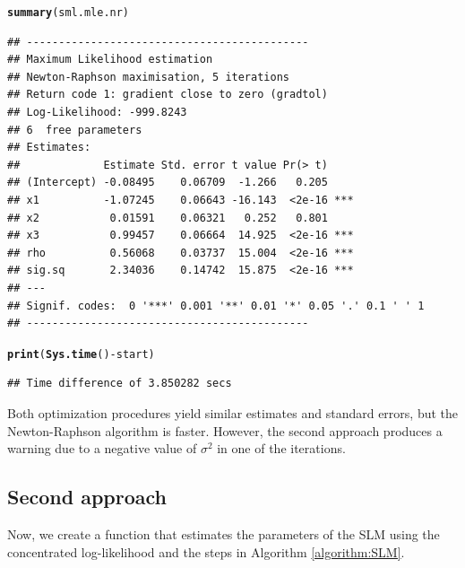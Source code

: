 \documentclass[english,12pt]{book}\usepackage[]{graphicx}\usepackage[]{xcolor}
\makeatletter
\newcommand{\hlopt}[1]{\textcolor[rgb]{0,0,0}{#1}}%
\newcommand{\hlstd}[1]{\textcolor[rgb]{0.345,0.345,0.345}{#1}}%
\newcommand{\hlkwd}[1]{\textcolor[rgb]{0.737,0.353,0.396}{\textbf{#1}}}%
\newenvironment{kframe}{%
 \def\at@end@of@kframe{}%
 \ifinner\ifhmode%
  \def\at@end@of@kframe{\end{minipage}}%
  \begin{minipage}{\columnwidth}%
 \fi\fi%
 \def\FrameCommand##1{\hskip\@totalleftmargin \hskip-\fboxsep
 \colorbox{shadecolor}{##1}\hskip-\fboxsep
     \hskip-\linewidth \hskip-\@totalleftmargin \hskip\columnwidth}%
 \MakeFramed {\advance\hsize-\width
   \@totalleftmargin\z@ \linewidth\hsize
   \@setminipage}}%
 {\par\unskip\endMakeFramed%
 \at@end@of@kframe}
\newenvironment{knitrout}{}{} %
\makeatother
\begin{document}
\begin{knitrout}
\begin{kframe}
{\ttfamily\noindent\color{warningcolor}{\#\# Warning in log(2 * pi * sig.sq): NaNs produced}}\begin{alltt}
\hlkwd{summary}\hlstd{(sml.mle.nr)}
\end{alltt}
\begin{verbatim}
## --------------------------------------------
## Maximum Likelihood estimation
## Newton-Raphson maximisation, 5 iterations
## Return code 1: gradient close to zero (gradtol)
## Log-Likelihood: -999.8243 
## 6  free parameters
## Estimates:
##             Estimate Std. error t value Pr(> t)    
## (Intercept) -0.08495    0.06709  -1.266   0.205    
## x1          -1.07245    0.06643 -16.143  <2e-16 ***
## x2           0.01591    0.06321   0.252   0.801    
## x3           0.99457    0.06664  14.925  <2e-16 ***
## rho          0.56068    0.03737  15.004  <2e-16 ***
## sig.sq       2.34036    0.14742  15.875  <2e-16 ***
## ---
## Signif. codes:  0 '***' 0.001 '**' 0.01 '*' 0.05 '.' 0.1 ' ' 1
## --------------------------------------------
\end{verbatim}
\begin{alltt}
\hlkwd{print}\hlstd{(}\hlkwd{Sys.time}\hlstd{()}\hlopt{-} \hlstd{start)}
\end{alltt}
\begin{verbatim}
## Time difference of 3.850282 secs
\end{verbatim}
\end{kframe}
\end{knitrout}

Both optimization procedures yield similar estimates and standard errors, but the Newton-Raphson algorithm is faster. However, the second approach produces a warning due to a negative value of $\sigma^2$ in one of the iterations.

\subsection{Second approach}\label{sec:code-condentrated-slm}

Now, we create a function that estimates the parameters of the SLM using the concentrated log-likelihood and  the steps in Algorithm \eqref{algorithm:SLM}.
\end{document}
